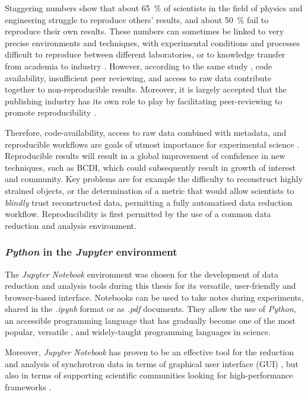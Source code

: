 Staggering numbers \parencite{Baker2016} show that about \qty{65}{\percent} of scientists in the field of physics and engineering struggle to reproduce others' results, and about \qty{50}{\percent} fail to reproduce their own results.
These numbers can sometimes be linked to very precise environments and techniques, with experimental conditions and processes difficult to reproduce between different laboratories, or to knowledge transfer from academia to industry \parencite{Sarwitz2015}.
However, according to the same study \parencite{Baker2016}, code availability, insufficient peer reviewing, and access to raw data contribute together to non-reproducible results.
Moreover, it is largely accepted that the publishing industry has its own role to play by facilitating peer-reviewing to promote reproducibility \parencite{Lee2017}.

Therefore, code-availability, access to raw data combined with metadata, and reproducible workflows are goals of utmost importance for experimental science \parencite{Munafo2017}.
Reproducible results will result in a global improvement of confidence in new techniques, such as BCDI, which could subsequently result in growth of interest and community.
Key problems are for example the difficulty to reconstruct highly strained objects, or the determination of a metric that would allow scientists to \textit{blindly} trust reconstructed data, permitting a fully automatised data reduction workflow.
Reproducibility is first permitted by the use of a common data reduction and analysis environment.

\subsubsection{\textit{Python} in the \textit{Jupyter} environment}

The \textit{Jupyter Notebook} environment \parencite{Perez2007, Kluyver2016} was chosen for the development of data reduction and analysis tools during this thesis for its versatile, user-friendly and browser-based interface.
Notebooks can be used to take notes during experiments, shared in the \textit{.ipynb} format or as \textit{.pdf} documents.
They allow the use of \textit{Python}, an accessible programming language that has gradually become one of the most popular, versatile \parencite{Perez2007, Behnel2011, Newville2016, Ronaghi2017}, and widely-taught \parencite{Ayer2014, Scopatz2015, McKinney2017, Boulle2019} programming languages in science.

Moreover, \textit{Jupyter Notebook} has proven to be an effective tool for the reduction and analysis of synchrotron data in terms of graphical user interface (GUI) \parencite{Martini2019a,Simonne2020}, but also in terms of supporting scientific communities looking for high-performance frameworks \parencite{jupyter_computing_4, jupyter_computing_1, jupyter_computing_3, jupyter_computing_2}.

